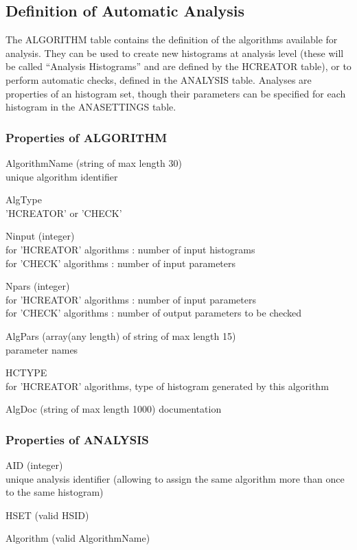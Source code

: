 \documentclass{lhcbnote}
\begin{document}
\subsection{Definition of Automatic Analysis}
The ALGORITHM table contains the definition of the algorithms
available for analysis. They can be used to create new histograms at
analysis level (these will be called ``Analysis Histograms'' and are
defined by the HCREATOR table), or to perform automatic checks,
defined in the ANALYSIS table. Analyses are properties of an histogram
set, though their parameters can be specified for each histogram in
the ANASETTINGS table.

\subsubsection{Properties of ALGORITHM}
\begin{description}
\item{AlgorithmName} (string of max length 30)\\
unique algorithm identifier
\item{AlgType} \\
'HCREATOR' or 'CHECK'
\item{Ninput} (integer)\\
for 'HCREATOR' algorithms : number of input histograms\\
for 'CHECK' algorithms : number of input parameters
\item{Npars} (integer)\\
for 'HCREATOR' algorithms : number of input parameters\\
for 'CHECK' algorithms : number of output parameters to be checked
\item{AlgPars} (array(any length) of string of max length 15)\\
parameter names
\item{HCTYPE}\\
for 'HCREATOR' algorithms, type of histogram generated by this algorithm 
\item{AlgDoc} (string of max length 1000)
documentation

\end{description}

\subsubsection{Properties of ANALYSIS}
\begin{description}
\item{AID} (integer)\\
unique analysis identifier (allowing to assign the same algorithm more
than once to the same histogram)
\item{HSET}  (valid HSID)
\item{Algorithm}  (valid AlgorithmName)
\end{description}
\end{document}
